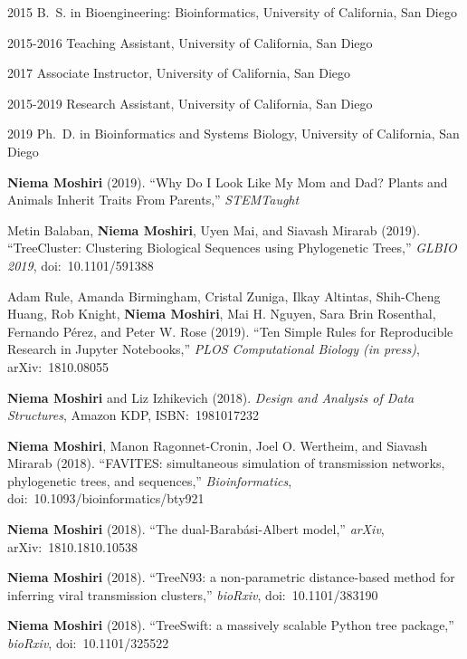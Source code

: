 \begin{frontmatter}
\begin{vitapage}
\begin{vita}
\item[2015] B.~S. in Bioengineering: Bioinformatics, University of California, San Diego
\item[2015-2016] Teaching Assistant, University of California, San Diego
\item[2017] Associate Instructor, University of California, San Diego
\item[2015-2019] Research Assistant, University of California, San Diego
\item[2019] Ph.~D. in Bioinformatics and Systems Biology, University of California, San Diego
\end{vita}
\begin{publications}
\item \textbf{Niema Moshiri} (2019). ``Why Do I Look Like My Mom and Dad? Plants and Animals Inherit Traits From Parents,'' \textit{STEMTaught}
\item Metin Balaban, \textbf{Niema Moshiri}, Uyen Mai, and Siavash Mirarab (2019). ``TreeCluster: Clustering Biological Sequences using Phylogenetic Trees,'' \textit{GLBIO 2019}, doi:~10.1101/591388
\item Adam Rule, Amanda Birmingham, Cristal Zuniga, Ilkay Altintas, Shih-Cheng Huang, Rob Knight, \textbf{Niema Moshiri}, Mai H. Nguyen, Sara Brin Rosenthal, Fernando Pérez, and Peter W. Rose (2019). ``Ten Simple Rules for Reproducible Research in Jupyter Notebooks,'' \textit{PLOS Computational Biology (in press)}, arXiv:~1810.08055
\item \textbf{Niema Moshiri} and Liz Izhikevich (2018). \textit{Design and Analysis of Data Structures}, Amazon KDP, ISBN:~1981017232
\item \textbf{Niema Moshiri}, Manon Ragonnet-Cronin, Joel O. Wertheim, and Siavash Mirarab (2018). ``FAVITES: simultaneous simulation of transmission networks, phylogenetic trees, and sequences,'' \textit{Bioinformatics}, doi:~10.1093/bioinformatics/bty921
\item \textbf{Niema Moshiri} (2018). ``The dual-Barab\'asi-Albert model,'' \textit{arXiv}, arXiv:~1810.1810.10538
\item \textbf{Niema Moshiri} (2018). ``TreeN93: a non-parametric distance-based method for inferring viral transmission clusters,'' \textit{bioRxiv}, doi:~10.1101/383190
\item \textbf{Niema Moshiri} (2018). ``TreeSwift: a massively scalable Python tree package,'' \textit{bioRxiv}, doi:~10.1101/325522

\end{publications}
\end{vitapage}
\end{frontmatter}
